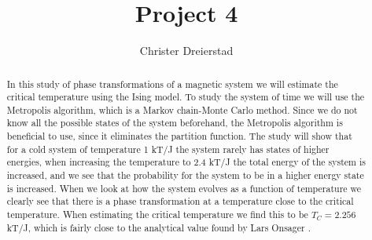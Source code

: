 \documentclass{emulateapj}
\begin{document}
\title{Project 4}

\author{Christer Dreierstad}





\begin{abstract}
In this study of phase transformations of a magnetic system we will estimate the critical temperature using the Ising model. To study the system of time we will use the Metropolis algorithm, which is a Markov chain-Monte Carlo method. Since we do not know all the possible states of the system beforehand, the Metropolis algorithm is beneficial to use, since it eliminates the partition function. The study will show that for a cold system of temperature 1 kT/J the system rarely has states of higher energies, when increasing the temperature to 2.4 kT/J the total energy of the system is increased, and we see that the probability for the system to be in a higher energy state is increased. When we look at how the system evolves as a function of temperature we clearly see that there is a phase transformation at a temperature close to the critical temperature. When estimating the critical temperature we find this to be $T_C = 2.256$ kT/J, which is fairly close to the analytical value found by Lars Onsager \cite{bib:onsager}.

\end{abstract}
\end{document}
